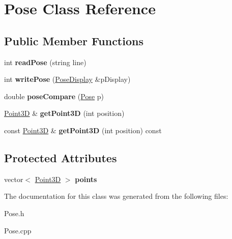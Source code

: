 \hypertarget{classPose}{}\section{Pose Class Reference}
\label{classPose}
\subsection*{Public Member Functions}
\begin{DoxyCompactItemize}
\item 
\hypertarget{classPose_a7435f9e29f346c489c830b6eeece4562}{}int {\bfseries read\+Pose} (string line)\label{classPose_a7435f9e29f346c489c830b6eeece4562}

\item 
\hypertarget{classPose_ac044bc60b60d7ad3b8fa1db02b6b0b07}{}int {\bfseries write\+Pose} (\hyperlink{classPoseDisplay}{Pose\+Display} \&p\+Display)\label{classPose_ac044bc60b60d7ad3b8fa1db02b6b0b07}

\item 
\hypertarget{classPose_a6db9c0f53878ebd46e721c81f138d32d}{}double {\bfseries pose\+Compare} (\hyperlink{classPose}{Pose} p)\label{classPose_a6db9c0f53878ebd46e721c81f138d32d}

\item 
\hypertarget{classPose_a8252053c77047d1e2d2e79d393e3adef}{}\hyperlink{classPoint3D}{Point3\+D} \& {\bfseries get\+Point3\+D} (int position)\label{classPose_a8252053c77047d1e2d2e79d393e3adef}

\item 
\hypertarget{classPose_a06f956b0ab2b046cb2385f10ac79ebc1}{}const \hyperlink{classPoint3D}{Point3\+D} \& {\bfseries get\+Point3\+D} (int position) const \label{classPose_a06f956b0ab2b046cb2385f10ac79ebc1}

\end{DoxyCompactItemize}
\subsection*{Protected Attributes}
\begin{DoxyCompactItemize}
\item 
\hypertarget{classPose_ab9f5423ef45012b900d1f968d89e2154}{}vector$<$ \hyperlink{classPoint3D}{Point3\+D} $>$ {\bfseries points}\label{classPose_ab9f5423ef45012b900d1f968d89e2154}

\end{DoxyCompactItemize}


The documentation for this class was generated from the following files\+:\begin{DoxyCompactItemize}
\item 
Pose.\+h\item 
Pose.\+cpp\end{DoxyCompactItemize}
